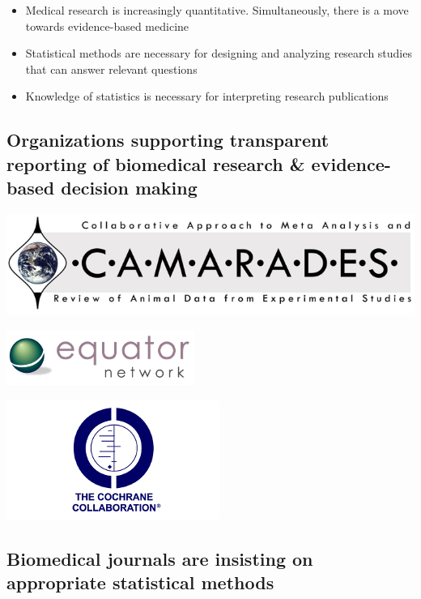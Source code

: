 \documentclass[
]{book}
\providecommand{\tightlist}{%
  \setlength{\itemsep}{0pt}\setlength{\parskip}{0pt}}
\begin{document}
\begin{itemize}
\tightlist
\item
  Medical research is increasingly quantitative. Simultaneously, there is a move towards evidence-based medicine
\item
  Statistical methods are necessary for designing and analyzing research studies that can answer relevant questions
\item
  Knowledge of statistics is necessary for interpreting research publications
\end{itemize}

\hypertarget{organizations-supporting-transparent-reporting-of-biomedical-research-evidence-based-decision-making}{%
\subsection{Organizations supporting transparent reporting of biomedical research \& evidence-based decision making}\label{organizations-supporting-transparent-reporting-of-biomedical-research-evidence-based-decision-making}}

\includegraphics[width=1\linewidth]{./1_54a}

\includegraphics[width=0.3\linewidth]{./1_54b}

\includegraphics[width=0.3\linewidth]{./1_54c}

\hypertarget{biomedical-journals-are-insisting-on-appropriate-statistical-methods}{%
\subsection{Biomedical journals are insisting on appropriate statistical methods}\label{biomedical-journals-are-insisting-on-appropriate-statistical-methods}}
\end{document}
